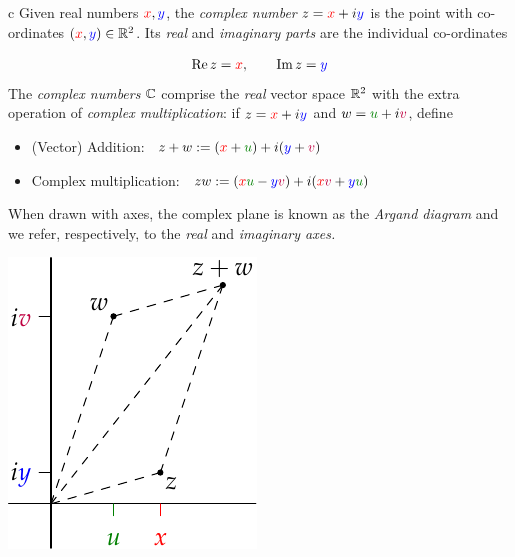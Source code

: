 \begin{defn}{}{c}
	Given real numbers $\textcolor{red}{x},\textcolor{blue}{y}$, the \emph{complex number} $z=\textcolor{red}{x}+i\textcolor{blue}{y}$ is the point with co-ordinates $(\textcolor{red}{x},\textcolor{blue}{y})\in\R^2$. Its \emph{real} and \emph{imaginary parts} are the individual co-ordinates\par
	\begin{minipage}[t]{0.7\linewidth}\vspace{-15pt}
		\[
			\Re z=\textcolor{red}{x},\qquad \Im z=\textcolor{blue}{y}
		\]
		The \emph{complex numbers} $\C$ comprise the \emph{real} vector space $\R^2$ with the extra operation of \emph{complex multiplication}: if $z=\textcolor{red}{x}+i\textcolor{blue}{y}$ and $w=\textcolor{Green}{u}+i\textcolor{purple}{v}$, define
		\begin{itemize}
		  \item[](Vector) Addition: \ $z+w:=(\textcolor{red}{x}+\textcolor{Green}{u})+i(\textcolor{blue}{y}+\textcolor{purple}{v})$
		  \item[]Complex multiplication: \ $zw:= (\textcolor{red}{x}\textcolor{Green}{u} - \textcolor{blue}{y}\textcolor{purple}{v}) + i(\textcolor{red}{x}\textcolor{purple}{v} + \textcolor{blue}{y}\textcolor{Green}{u})$
		\end{itemize}
		When drawn with axes, the complex plane is known as the \emph{Argand diagram} and we refer, respectively, to the \emph{real} and \emph{imaginary axes.}
	\end{minipage}
	\hfill
	\begin{minipage}[t]{0.29\linewidth}\vspace{-15pt}
		\flushright\includegraphics{intro-add}
	\end{minipage}
\end{defn}

